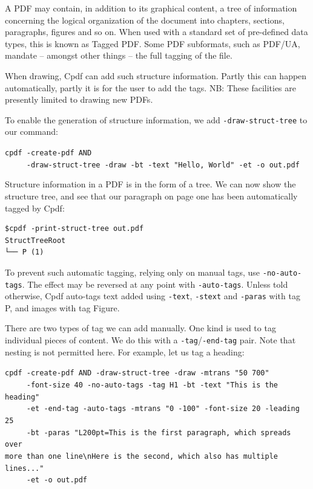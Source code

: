 \documentclass{book}
\begin{document}
A PDF may contain, in addition to its graphical content, a tree of information concerning the logical organization of the document into chapters, sections, paragraphs, figures and so on. When used with a standard set of pre-defined data types, this is known as Tagged PDF. Some PDF subformats, such as PDF/UA, mandate -- amongst other things -- the full tagging of the file.

When drawing, Cpdf can add such structure information. Partly this can happen automatically, partly it is for the user to add the tags. NB: These facilities are presently limited to drawing new PDFs.

To enable the generation of structure information, we add \texttt{-draw-struct-tree} to our command:

\begin{framed}
   \noindent\small\verb!cpdf -create-pdf AND!\\
   \noindent\small\verb!     -draw-struct-tree -draw -bt -text "Hello, World" -et -o out.pdf!
\end{framed}

\noindent Structure information in a PDF is in the form of a tree. We can now show the structure tree, and see that our paragraph on page one has been automatically tagged by Cpdf:

\begin{verbatim}
$cpdf -print-struct-tree out.pdf
StructTreeRoot
└── P (1)\end{verbatim}

\noindent To prevent such automatic tagging, relying only on manual tags, use \texttt{-no-auto-tags}. The effect may be reversed at any point with \texttt{-auto-tags}. Unless told otherwise, Cpdf auto-tags text added using \texttt{-text}, \texttt{-stext} and \texttt{-paras} with tag P, and images with tag Figure.

There are two types of tag we can add manually. One kind is used to tag individual pieces of content. We do this with a \texttt{-tag}/\texttt{-end-tag} pair. Note that nesting is not permitted here. For example, let us tag a heading:

\begin{framed}
   \noindent\small\verb!cpdf -create-pdf AND -draw-struct-tree -draw -mtrans "50 700" !\\
   \noindent\small\verb!     -font-size 40 -no-auto-tags -tag H1 -bt -text "This is the heading"!\\
   \noindent\small\verb!     -et -end-tag -auto-tags -mtrans "0 -100" -font-size 20 -leading 25!\\
   \noindent\small\verb!     -bt -paras "L200pt=This is the first paragraph, which spreads over!\\
   \noindent\small\verb!more than one line\nHere is the second, which also has multiple lines..."!\\
   \noindent\small\verb!     -et -o out.pdf!
\end{framed}
\end{document}
